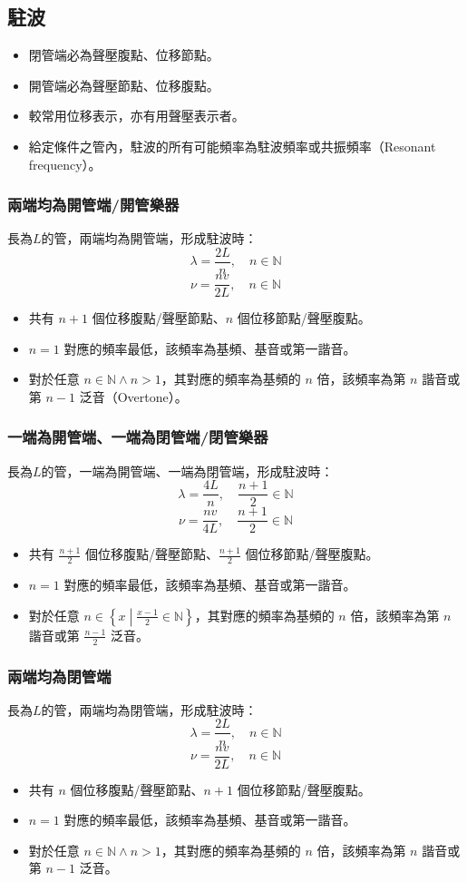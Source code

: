 \documentclass[a4paper,12pt]{report}
\begin{document}
\subsection{駐波}
\begin{itemize}
\item 閉管端必為聲壓腹點、位移節點。
\item 開管端必為聲壓節點、位移腹點。
\item 較常用位移表示，亦有用聲壓表示者。
\item 給定條件之管內，駐波的所有可能頻率為駐波頻率或共振頻率（Resonant frequency）。
\end{itemize}
\subsubsection{兩端均為開管端/開管樂器}
長為$L$的管，兩端均為開管端，形成駐波時：
\[\lambda = \frac{2L}{n},\quad n\in\mathbb{N} \]
\[\nu = \frac{nv}{2L},\quad n\in\mathbb{N} \]
\begin{itemize}
\item 共有 $n+1$ 個位移腹點/聲壓節點、$n$ 個位移節點/聲壓腹點。
\item $n=1$ 對應的頻率最低，該頻率為基頻、基音或第一諧音。
\item 對於任意 $n\in\mathbb{N}\land n>1$，其對應的頻率為基頻的 $n$ 倍，該頻率為第 $n$ 諧音或第 $n-1$ 泛音（Overtone）。
\end{itemize}
\subsubsection{一端為開管端、一端為閉管端/閉管樂器}
長為$L$的管，一端為開管端、一端為閉管端，形成駐波時：
\[\lambda = \frac{4L}{n},\quad \frac{n+1}{2}\in\mathbb{N} \]
\[\nu = \frac{nv}{4L},\quad \frac{n+1}{2}\in\mathbb{N} \]
\begin{itemize}
\item 共有 $\frac{n+1}{2}$ 個位移腹點/聲壓節點、$\frac{n+1}{2}$ 個位移節點/聲壓腹點。
\item $n=1$ 對應的頻率最低，該頻率為基頻、基音或第一諧音。
\item 對於任意 $n\in\left\{x\middle|\frac{x-1}{2}\in\mathbb{N}\right\}$，其對應的頻率為基頻的 $n$ 倍，該頻率為第 $n$ 諧音或第 $\frac{n-1}{2}$ 泛音。
\end{itemize}
\subsubsection{兩端均為閉管端}
長為$L$的管，兩端均為閉管端，形成駐波時：
\[\lambda = \frac{2L}{n},\quad n\in\mathbb{N} \]
\[\nu = \frac{nv}{2L},\quad n\in\mathbb{N} \]
\begin{itemize}
\item 共有 $n$ 個位移腹點/聲壓節點、$n+1$ 個位移節點/聲壓腹點。
\item $n=1$ 對應的頻率最低，該頻率為基頻、基音或第一諧音。
\item 對於任意 $n\in\mathbb{N}\land n>1$，其對應的頻率為基頻的 $n$ 倍，該頻率為第 $n$ 諧音或第 $n-1$ 泛音。
\end{itemize}
\end{document}
